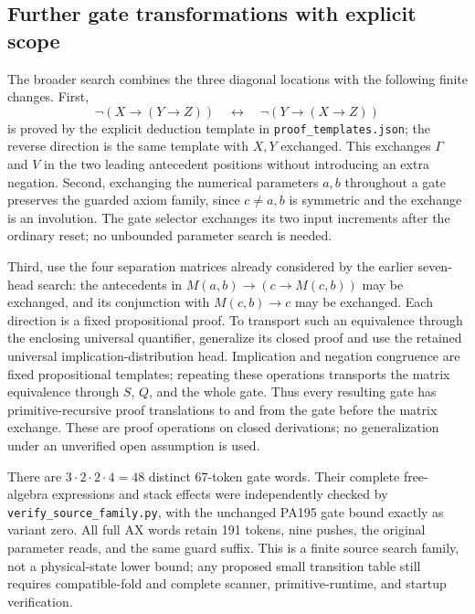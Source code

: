 \subsection{Further gate transformations with explicit scope}
The broader search combines the three diagonal locations with the following
finite changes.  First,
\[
 \neg(X\to(Y\to Z))\quad\longleftrightarrow\quad
 \neg(Y\to(X\to Z))
\]
is proved by the explicit deduction template in
\texttt{proof\_templates.json}; the reverse direction is the
same template with $X,Y$ exchanged.  This exchanges $\Gamma$ and $V$ in the
two leading antecedent positions without introducing an extra negation.
Second, exchanging the numerical parameters $a,b$ throughout a gate preserves
the guarded axiom family, since $c\ne a,b$ is symmetric and the exchange is
an involution.  The gate selector exchanges its two input increments after
the ordinary reset; no unbounded parameter search is needed.

Third, use the four separation matrices already considered by the earlier
seven-head search: the antecedents in
$M(a,b)\to(c\to M(c,b))$ may be exchanged, and its conjunction with
$M(c,b)\to c$ may be exchanged.  Each direction is a fixed propositional
proof.  To transport such an equivalence through the enclosing universal
quantifier, generalize its closed proof and use the retained universal
implication-distribution head.  Implication and negation congruence are fixed
propositional templates; repeating these operations transports the matrix
equivalence through $S$, $Q$, and the whole gate.  Thus every resulting gate
has primitive-recursive proof translations to and from the gate before the
matrix exchange.  These are proof operations on closed derivations; no
generalization under an unverified open assumption is used.

There are $3\cdot2\cdot2\cdot4=48$ distinct 67-token gate words.  Their
complete free-algebra expressions and stack effects were independently
checked by \texttt{verify\_source\_family.py}, with the unchanged PA195 gate
bound exactly as variant zero.  All full AX words retain 191 tokens, nine
pushes, the original parameter reads, and the same guard suffix.  This is a
finite source search family, not a physical-state lower bound; any proposed
small transition table still requires compatible-fold and complete scanner,
primitive-runtime, and startup verification.
